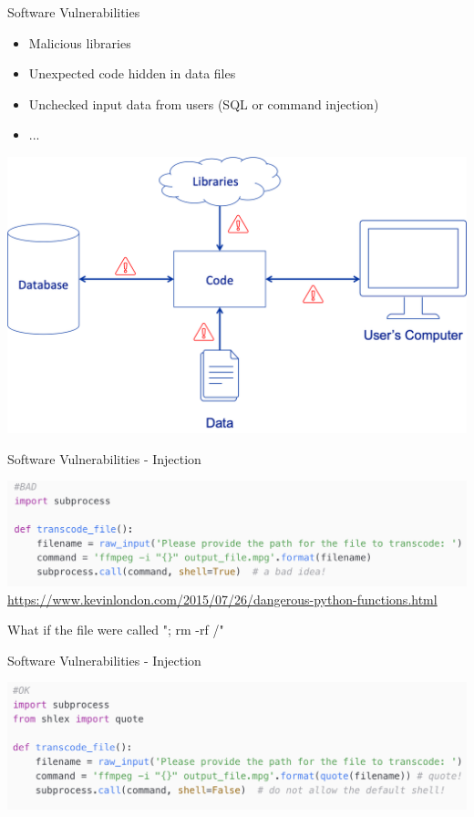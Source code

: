 \documentclass{beamer}
\begin{document}
\begin{frame}{Software Vulnerabilities}
\begin{itemize}
\item Malicious libraries
\item Unexpected code hidden in data files
\item Unchecked input data from users (SQL or command injection)
\item ... 
\end{itemize}
\begin{center}
\includegraphics[width=0.4\linewidth]{software-vulnerabilities-red.png}
\end{center}
\end{frame}

\begin{frame}{{\color{red}Software Vulnerabilities - Injection}}
\begin{center}
\includegraphics[width=1\linewidth]{bad-injection.png}\newline
{\tiny \url{https://www.kevinlondon.com/2015/07/26/dangerous-python-functions.html}}
\end{center}
What if the file were called "; rm -rf /"
\end{frame}

\begin{frame}{{\color{red}Software Vulnerabilities - Injection}}
\begin{center}
\includegraphics[width=1\linewidth]{good-injection.png}\newline
\end{center}
\end{frame}
\end{document}
